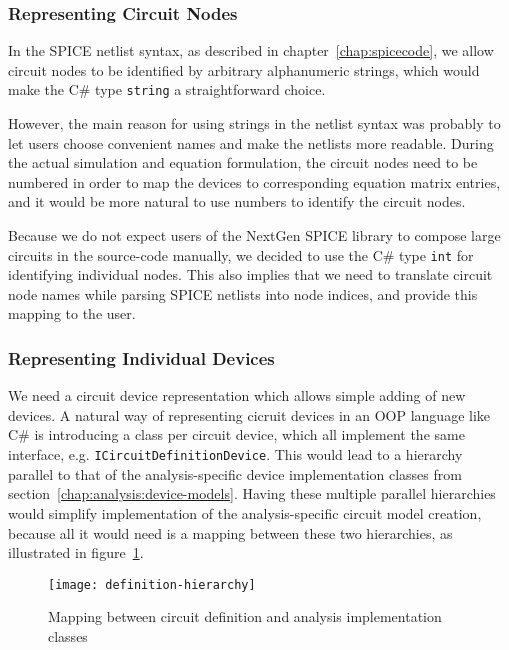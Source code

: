 \subsubsection{Representing Circuit Nodes} 
In the SPICE netlist syntax, as described in chapter~\ref{chap:spicecode}, we allow circuit nodes to be identified by arbitrary alphanumeric strings, which would make the C\# type \texttt{string} a straightforward choice.

However, the main reason for using strings in the netlist syntax was probably to let users choose convenient names and make the netlists more readable. During the actual simulation and equation formulation, the circuit nodes need to be numbered in order to map the devices to corresponding equation matrix entries, and it would be more natural to use numbers to identify the circuit nodes. 

Because we do not expect users of the NextGen SPICE library to compose large circuits in the source-code manually, we decided to use the C\# type \texttt{int} for identifying individual nodes. This also implies that we need to translate circuit node names while parsing SPICE netlists into node indices, and provide this mapping to the user.

\subsubsection{Representing Individual Devices}
\label{chap:analysis:representation}
We need a circuit device representation which allows simple adding of new devices. A natural way of representing cicruit devices in an OOP language like C\# is introducing a class per circuit device, which all implement the same interface, e.g. \texttt{ICircuitDefinitionDevice}. This would lead to a hierarchy parallel to that of the analysis-specific device implementation classes from section~\ref{chap:analysis:device-models}. Having these multiple parallel hierarchies would simplify implementation of the analysis-specific circuit model creation, because all it would need is a mapping between these two hierarchies, as illustrated in figure~\ref{fig:03-fig-definition-hierarchy}.

\begin{figure}[h]
	\centering
	\texttt{[image: definition-hierarchy]}
	\caption{Mapping between circuit definition and analysis implementation classes}
	\label{fig:03-fig-definition-hierarchy}
\end{figure}


